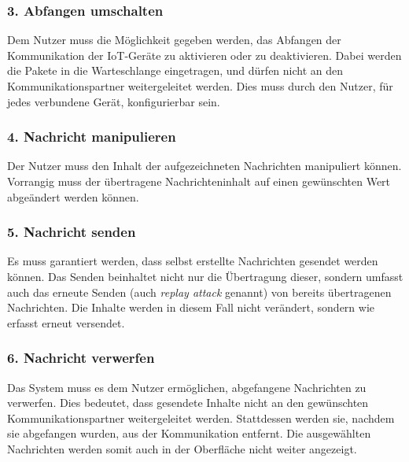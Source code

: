         \subsubsection{3. Abfangen umschalten}
        Dem Nutzer muss die Möglichkeit gegeben werden, das Abfangen der  Kommunikation der \ac{IoT}-Geräte zu aktivieren oder zu deaktivieren.
        Dabei werden die Pakete in die Warteschlange eingetragen, und dürfen nicht an den Kommunikationspartner weitergeleitet werden.
        Dies muss durch den Nutzer, für jedes verbundene Gerät, konfigurierbar sein.
        
        \subsubsection{4. Nachricht manipulieren}
        Der Nutzer muss den Inhalt der aufgezeichneten Nachrichten manipuliert können. Vorrangig muss der übertragene Nachrichteninhalt auf einen gewünschten Wert abgeändert werden können.
        
        \subsubsection{5. Nachricht senden}
        Es muss garantiert werden, dass selbst erstellte Nachrichten gesendet werden können.
        Das Senden beinhaltet nicht nur die Übertragung dieser, sondern umfasst auch das erneute Senden (auch \emph{replay attack} genannt) von bereits übertragenen Nachrichten. Die Inhalte werden in diesem Fall nicht verändert, sondern wie erfasst erneut versendet.
        
        \subsubsection{6. Nachricht verwerfen}
        Das System muss es dem Nutzer ermöglichen, abgefangene Nachrichten zu verwerfen.
        Dies bedeutet, dass gesendete Inhalte nicht an den gewünschten Kommunikationspartner weitergeleitet werden. Stattdessen werden sie, nachdem sie abgefangen wurden, aus der Kommunikation entfernt.
        Die ausgewählten Nachrichten werden somit auch in der Oberfläche nicht weiter angezeigt.
        
